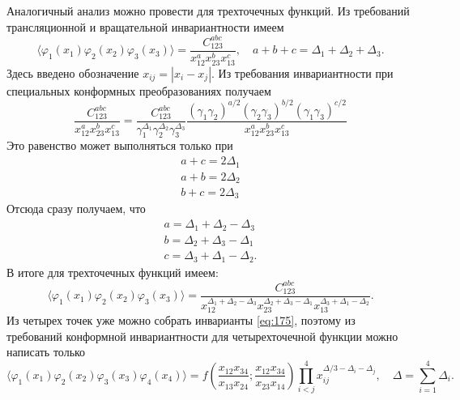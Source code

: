\documentclass[a4paper,12pt]{article}
\theoremstyle{definition}
\theoremstyle{definition}
\theoremstyle{definition}
\begin{document}
Аналогичный анализ можно провести для трехточечных функций. Из требований трансляционной и вращательной инвариантности имеем
\begin{equation}
  \label{eq:192}
  \langle \varphi_{1}(x_{1})\varphi_{2}(x_{2})\varphi_{3}(x_{3})\rangle=\frac{C^{abc}_{123}}{x_{12}^{a} x_{23}^{b}x_{13}^{c}},\quad a+b+c=\Delta_{1}+\Delta_{2}+\Delta_{3}.
\end{equation}
Здесь введено обозначение $x_{ij}=|x_{i}-x_{j}|$.
Из требования инвариантности при специальных конформных преобразованиях получаем
\begin{equation}
  \label{eq:193}
  \frac{C^{abc}_{123}}{x_{12}^{a} x_{23}^{b}x_{13}^{c}}=\frac{C^{abc}_{123}}{\gamma_{1}^{\Delta_{1}}\gamma_{2}^{\Delta_{2}}\gamma_{3}^{\Delta_{3}}}\frac{(\gamma_{1}\gamma_{2})^{a/2}(\gamma_{2}\gamma_{3})^{b/2}(\gamma_{1}\gamma_{3})^{c/2}}{x_{12}^{a} x_{23}^{b}x_{13}^{c}}
\end{equation}
Это равенство может выполняться только при
\begin{equation}
  \label{eq:194}
  \begin{array}{l}
    a+c=2\Delta_{1}\\
    a+b=2\Delta_{2}\\
    b+c=2\Delta_{3}
  \end{array}
\end{equation}
Отсюда сразу получаем, что
\begin{equation}
  \label{eq:195}
  \begin{array}{l}
    a=\Delta_{1}+\Delta_{2}-\Delta_{3}\\
    b=\Delta_{2}+\Delta_{3}-\Delta_{1}\\
    c=\Delta_{3}+\Delta_{1}-\Delta_{2}.
  \end{array}
\end{equation}
В итоге для трехточечных функций имеем:
\begin{equation}
  \label{eq:196}
   \langle \varphi_{1}(x_{1})\varphi_{2}(x_{2})\varphi_{3}(x_{3})\rangle=\frac{C^{abc}_{123}}{x_{12}^{\Delta_{1}+\Delta_{2}-\Delta_{3}} x_{23}^{\Delta_{2}+\Delta_{3}-\Delta_{1}}x_{13}^{\Delta_{3}+\Delta_{1}-\Delta_{2}}}.
\end{equation}
Из четырех точек уже можно собрать инварианты \eqref{eq:175}, поэтому из требований конформной
инвариантности для четырехточечной функции можно написать только 
\begin{equation}
  \label{eq:197}
  \langle \varphi_{1}(x_{1})\varphi_{2}(x_{2})\varphi_{3}(x_{3})\varphi_{4}(x_{4})\rangle=f\left(\frac{x_{12}x_{34}}{x_{13}x_{24}}; \frac{x_{12}x_{34}}{x_{23}x_{14}}\right) \prod_{i<j}^{4}x_{ij}^{\Delta/3-\Delta_{i}-\Delta_{j}},\quad \Delta=\sum_{i=1}^{4}\Delta_{i}.
\end{equation}
\end{document}
